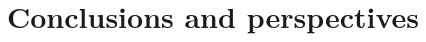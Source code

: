 \documentclass[english]{article}
\begin{document}
\section{Conclusions and perspectives}

\end{document}
